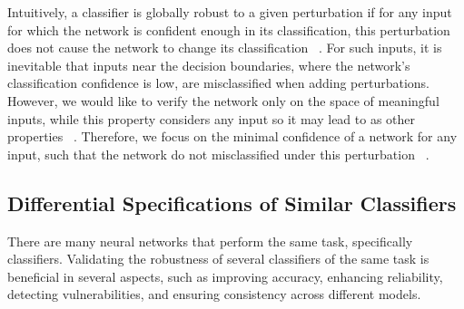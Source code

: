 Intuitively, a classifier is globally robust to a given perturbation if for any input for which the network is confident enough in its classification, this perturbation does not cause the network to change its classification ~\cite{GLOBALROBUSNN}. For such inputs, it is inevitable that inputs near the decision boundaries, where the network’s classification confidence is low, are misclassified when adding perturbations. However, we would like to verify the network only on the space of meaningful inputs, while this property considers any input so it may lead to as other properties ~\cite{Reluplex,EFCIENTGLOBALROBU}. Therefore, we focus on the minimal confidence of a network for any input, such that the network do not misclassified under this perturbation ~\cite{VHAGAR}.
     
\subsection{Differential Specifications of Similar Classifiers}
There are many neural networks that perform the same task, specifically classifiers. Validating the robustness of several classifiers of the same task is beneficial in several aspects, such as improving accuracy, enhancing reliability, detecting vulnerabilities, and ensuring consistency across different models.

